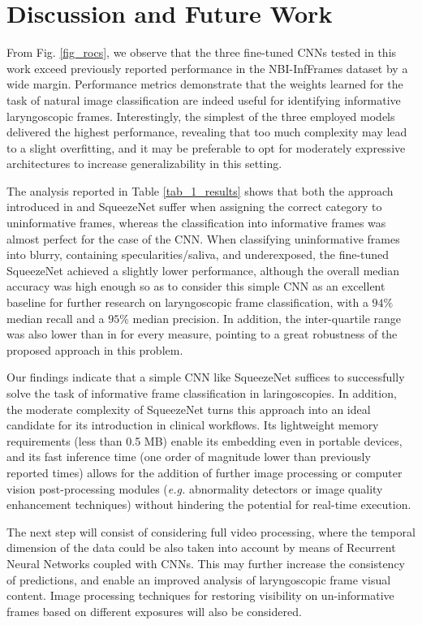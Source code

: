 \section{Discussion and Future Work}
From Fig. \ref{fig_rocs}, we observe that the three fine-tuned CNNs tested in this work exceed previously reported performance in the NBI-InfFrames dataset by a wide margin. Performance metrics demonstrate that the weights learned for the task of natural image classification are indeed useful for identifying informative laryngoscopic frames. Interestingly, the simplest of the three employed models delivered the highest performance, revealing that too much complexity may lead to a slight overfitting, and it may be preferable to opt for moderately expressive architectures to increase generalizability in this setting.

The analysis reported in Table \ref{tab_1_results} shows that both the approach introduced in \cite{moccia_learning-based_2018} and SqueezeNet suffer when assigning the correct category to uninformative frames, whereas the classification into informative frames was almost perfect for the case of the CNN. When classifying uninformative frames into blurry, containing specularities/saliva, and underexposed, the fine-tuned SqueezeNet achieved a slightly lower performance, although the overall median accuracy was high enough so as to consider this simple CNN as an excellent baseline for further research on laryngoscopic frame classification, with a $94\%$ median recall and a $95\%$ median precision. In addition, the inter-quartile range was also lower than in \cite{moccia_learning-based_2018} for every measure, pointing to a great robustness of the proposed approach in this problem.

Our findings indicate that a simple CNN like SqueezeNet suffices to successfully solve the task of informative frame classification in laringoscopies. In addition, the moderate complexity of SqueezeNet turns this approach into an ideal candidate for its introduction in clinical workflows. Its lightweight memory requirements (less than 0.5 MB) enable its embedding even in portable devices, and its fast inference time (one order of magnitude lower than previously reported times) allows for the addition of further image processing or computer vision post-processing modules (\textit{e.g.} abnormality detectors or image quality enhancement techniques) without hindering the potential for real-time execution.

The next step will consist of considering full video processing, where the temporal dimension of the data could be also taken into account by means of Recurrent Neural Networks coupled with CNNs. This may further increase the consistency of predictions, and enable an improved analysis of laryngoscopic frame visual content. Image processing techniques for restoring visibility on un-informative frames based on different exposures \cite{galdran_image_2018} will also be considered.